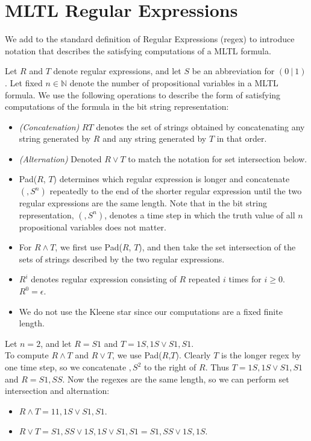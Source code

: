 \documentclass[runningheads]{llncs}
\begin{document}
\section{MLTL Regular Expressions} \label{regex}
We add to the standard definition of Regular Expressions (regex) \cite{sipser} to introduce notation that describes the satisfying computations of a MLTL formula.
\begin{definition}
Let $R$ and $T$ denote regular expressions, and let $S$ be an abbreviation for $(0 \ | \ 1)$. Let fixed $n \in \mathbb{N}$ denote the number of propositional variables in a MLTL formula. We use the following operations to describe the form of satisfying computations of the formula in the bit string representation:
\begin{itemize}
    \item \emph{(Concatenation)} $RT$ denotes the set of strings obtained by concatenating any string generated by $R$ and any string generated by $T$ in that order.
    \item \emph{(Alternation)} Denoted $R \lor T$ to match the notation for set intersection below.
    \item Pad($R$, $T$) determines which regular expression is longer and concatenate $(,S^n)$ repeatedly to the end of the shorter regular expression until the two regular expressions are the same length. Note that in the bit string representation, $(,S^n)$, denotes a time step in which the truth value of all $n$ propositional variables does not matter.
    \item For $R \land T$, we first use Pad($R$, $T$), and then take the set intersection of the sets of strings described by the two regular expressions.
      \item $R^i$ denotes regular expression consisting of $R$ repeated $i$ times for $i \geq 0$. $R^0 = \epsilon$. %
    \item We do not use the Kleene star since our computations are a fixed finite length.
\end{itemize}
\end{definition}
\begin{example}
Let $n = 2$, and let $R = S1$ and $T = 1S,1S \lor S1,S1$.\\
To compute $R \land T$ and $R \lor T$, we use Pad($R$,$T$). Clearly $T$ is the longer regex by one time step, so we concatenate $,S^2$ to the right of $R$. Thus $T =1S,1S \lor S1,S1$ and $R = S1,SS$. Now the regexes are the same length, so we can perform set intersection and alternation:
\begin{itemize}
    \item $R \land T = 11,1S \lor S1, S1$.
    \item $R \lor T = S1,SS \lor 1S,1S \lor S1,S1 = S1,SS \lor 1S,1S$.
\end{itemize}
\end{example}
\end{document}
